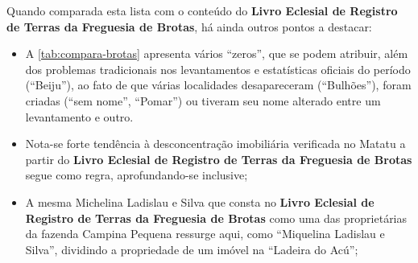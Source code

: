 Quando comparada esta lista com o conteúdo do \textbf{Livro Eclesial de Registro de Terras da Freguesia de Brotas}, há ainda outros pontos a destacar:



\begin{itemize}
\item A \autoref{tab:compara-brotas} apresenta vários ``zeros'', que se podem atribuir, além dos problemas tradicionais nos levantamentos e estatísticas oficiais do período (``Beiju''), ao fato de que várias localidades desapareceram (``Bulhões''), foram criadas (``sem nome'', ``Pomar'') ou tiveram seu nome alterado entre um levantamento e outro.
\item Nota-se forte tendência à desconcentração imobiliária verificada no Matatu a partir do \textbf{Livro Eclesial de Registro de Terras da Freguesia de Brotas} segue como regra, aprofundando-se inclusive;
\item A mesma Michelina Ladislau e Silva que consta no \textbf{Livro Eclesial de Registro de Terras da Freguesia de Brotas} como uma das proprietárias da fazenda Campina Pequena ressurge aqui, como ``Miquelina Ladislau e Silva'', dividindo a propriedade de um imóvel na ``Ladeira do Acú'';
\end{itemize}